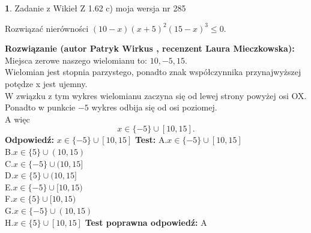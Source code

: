 \documentclass[12pt, a4paper]{article}
\theoremstyle{definition} %
\newtheorem{zad}{}
\newcommand{\zadStart}[1]{\begin{zad}#1\newline}
\newcommand{\zadStop}{\end{zad}}
\newcommand{\rozwStart}[2]{\noindent \textbf{Rozwiązanie (autor #1 , recenzent #2): }\newline}
\newcommand{\rozwStop}{\newline}
\newcommand{\odpStart}{\noindent \textbf{Odpowiedź:}\newline}
\newcommand{\odpStop}{\newline}
\newcommand{\testStart}{\noindent \textbf{Test:}\newline}
\newcommand{\testStop}{\newline}
\newcommand{\kluczStart}{\noindent \textbf{Test poprawna odpowiedź:}\newline}
\newcommand{\kluczStop}{\newline}
\begin{document}
\zadStart{Zadanie z Wikieł Z 1.62 c) moja wersja nr 285}

Rozwiązać nierówności $(10-x)(x+5)^{2}(15-x)^{3}\le0$.
\zadStop
\rozwStart{Patryk Wirkus}{Laura Mieczkowska}
Miejsca zerowe naszego wielomianu to: $10, -5, 15$.\\
Wielomian jest stopnia parzystego, ponadto znak współczynnika przy\linebreak najwyższej potędze x jest ujemny.\\ W związku z tym wykres wielomianu zaczyna się od lewej strony powyżej osi OX.\\
Ponadto w punkcie $-5$ wykres odbija się od osi poziomej.\\
A więc $$x \in \{-5\} \cup [10,15].$$
\rozwStop
\odpStart
$x \in \{-5\} \cup [10,15]$
\odpStop
\testStart
A.$x \in \{-5\} \cup [10,15]$\\
B.$x \in \{5\} \cup (10,15)$\\
C.$x \in \{-5\} \cup (10,15]$\\
D.$x \in \{5\} \cup (10,15]$\\
E.$x \in \{-5\} \cup [10,15)$\\
F.$x \in \{5\} \cup [10,15)$\\
G.$x \in \{-5\} \cup (10,15)$\\
H.$x \in \{5\} \cup [10,15]$
\testStop
\kluczStart
A
\kluczStop
\end{document}

